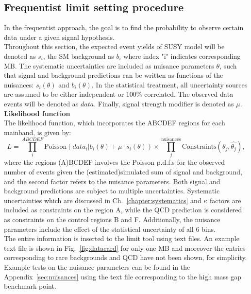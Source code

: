 \subsection{Frequentist limit setting procedure}
In the frequentist approach, the goal is to find the probability to observe certain data under a given signal hypothesis.\\
Throughout this section, the expected event yields of SUSY model will be denoted as $s_i$, the SM background as $b_i$ where index "i" indicates corresponding MB. The systematic uncertainties are included as nuisance parameters $\theta$, such that signal and background predictions can be written as functions of the nuisances: $s_i(\theta)$ and $b_i(\theta)$. In the statistical treatment, all uncertainty sources are assumed to be either independent or 100\% correlated. The observed data events will be denoted as $data$. Finally, signal strength modifier is denoted as $\mu$. \\
\textbf{Likelihood function}\\
The likelihood function, which incorporates the ABCDEF regions for each mainband, is given by:
\begin{equation}
\label{likelihood}
  L = \prod^{ABCDEF}_i \textrm{Poisson}(data_i | b_i(\theta) + \mu \cdot s_i(\theta)) \times \prod^{\textrm{nuisances}}_j \textrm{Constraints}(\theta_j, \hat{\theta_j}),
\end{equation}
where the regions (A)BCDEF involves the Poisson p.d.f.s for the observed number of events given the (estimated)simulated sum of signal and background, and the second factor refers to the nuisance parameters. Both signal and background predictions are subject to multiple uncertainties. Systematic uncertainties which are discussed in Ch.~\ref{chapter:systematics} and $\kappa$ factors are included as constraints on the region A, while the QCD prediction is considered as constraints on the control regions B and F. Additionally, the nuisance parameters include the effect of the statistical uncertainty of all 6 bins.\\
The entire information is inserted to the limit tool using text files. An example text file is shown in Fig.~\ref{fig:datacard} for only one MB and moreover the entries corresponding to rare backgrounds and QCD have not been shown, for simplicity. Example tests on the nuisance parameters can be found in the Appendix~\ref{sec:nuisances} using the text file corresponding to the high mass gap benchmark point.
